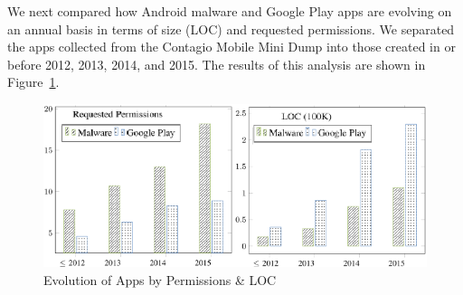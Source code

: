 \documentclass{llncs}
\begin{document}
We next compared how Android malware and Google Play apps are evolving on an annual basis in terms of size (LOC) and requested permissions. We separated the apps collected from the Contagio Mobile Mini Dump into those created in or before 2012, 2013, 2014, and 2015. The results of this analysis are shown in Figure~\ref{fig:Evolution}.







\begin{minipage}{1.0\linewidth}

          \begin{figure}[H]
          \center
              \includegraphics[width=\linewidth]{images/Evolution.png}
              \caption{Evolution of Apps by Permissions \& LOC} %
              \label{fig:Evolution}
          \end{figure}
      \end{minipage}




\end{document}
